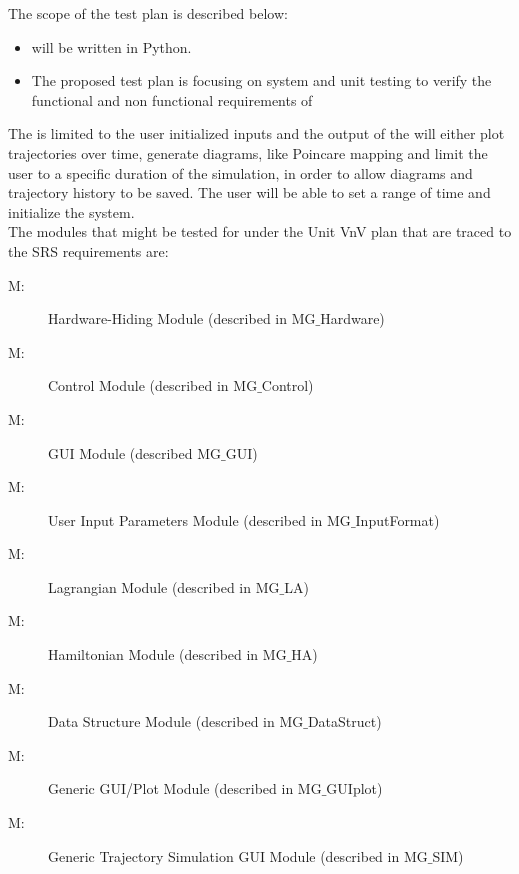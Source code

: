 \documentclass[12pt, titlepage]{article}
\newcounter{mnum}
\newcommand{\mthemnum}{M\themnum}
\begin{document}
The scope of the test plan is described below:
\begin{itemize}
\item \progname{} will be written in Python.
\item The proposed test plan is focusing on system and unit testing to
  verify the functional and non functional requirements of
  \progname{}
\end{itemize}

The \progname is limited to the user
initialized inputs and the output of the \progname will either plot 
trajectories over time, generate diagrams, like Poincare mapping
and limit the user to a specific duration of the simulation, in order to allow
diagrams and trajectory history to be saved.
The user will be able to set a range of time and initialize the system. \\

The modules that might be tested for under the Unit VnV plan that are traced 
to the SRS requirements are:
\begin{description}
\item [ \mthemnum \label{mHH}:] Hardware-Hiding Module 
(described in MG$\_$Hardware)
\item [ \mthemnum \label{mHH}:] \progname Control Module 
(described in MG$\_$Control)
\item [ \mthemnum \label{mHH}:] \progname GUI Module 
(described MG$\_$GUI)
\item [ \mthemnum \label{mHH}:] User Input Parameters 
Module (described in MG$\_$InputFormat)
\item [ \mthemnum \label{mHH}:] Lagrangian Module 
(described in MG$\_$LA)
\item [ \mthemnum \label{mHH}:] Hamiltonian Module 
(described in MG$\_$HA)
\item [ \mthemnum \label{mHH}:] Data Structure Module 
(described in MG$\_$DataStruct)
\item [ \mthemnum \label{mHH}:] Generic GUI/Plot Module 
(described in MG$\_$GUIplot)
\item [ \mthemnum \label{mHH}:] Generic Trajectory 
Simulation GUI Module (described in MG$\_$SIM)
\end{description}

\end{document}
